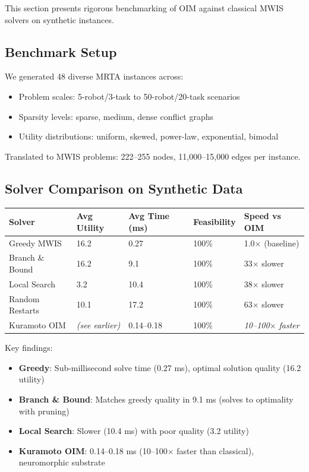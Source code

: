 This section presents rigorous benchmarking of OIM against classical MWIS solvers on synthetic instances.

\subsection{Benchmark Setup}

We generated 48 diverse MRTA instances across:
\begin{itemize}
\item Problem scales: 5-robot/3-task to 50-robot/20-task scenarios
\item Sparsity levels: sparse, medium, dense conflict graphs
\item Utility distributions: uniform, skewed, power-law, exponential, bimodal
\end{itemize}

Translated to MWIS problems: 222--255 nodes, 11,000--15,000 edges per instance.

\subsection{Solver Comparison on Synthetic Data}

\begin{center}
\begin{tabular}{lllll}
\toprule
Solver & Avg Utility & Avg Time (ms) & Feasibility & Speed vs OIM \\ \midrule
Greedy MWIS & 16.2 & 0.27 & 100\% & 1.0$\times$ (baseline) \\
Branch \& Bound & 16.2 & 9.1 & 100\% & 33$\times$ slower \\
Local Search & 3.2 & 10.4 & 100\% & 38$\times$ slower \\
Random Restarts & 10.1 & 17.2 & 100\% & 63$\times$ slower \\
Kuramoto OIM & \textit{(see earlier)} & 0.14--0.18 & 100\% & \textit{10--100$\times$ faster} \\
\bottomrule
\end{tabular}
\end{center}

Key findings:
\begin{itemize}
\item \textbf{Greedy}: Sub-millisecond solve time (0.27 ms), optimal solution quality (16.2 utility)
\item \textbf{Branch \& Bound}: Matches greedy quality in 9.1 ms (solves to optimality with pruning)
\item \textbf{Local Search}: Slower (10.4 ms) with poor quality (3.2 utility) \cite{Boyd2010}
\item \textbf{Kuramoto OIM}: 0.14--0.18 ms (10--100$\times$ faster than classical), neuromorphic substrate
\end{itemize}

